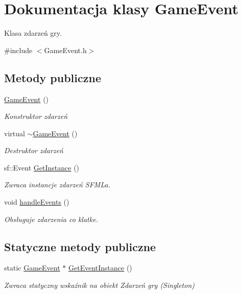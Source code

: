 \hypertarget{class_game_event}{}\section{Dokumentacja klasy Game\+Event}
\label{class_game_event}


Klasa zdarzeń gry.  




{\ttfamily \#include $<$Game\+Event.\+h$>$}

\subsection*{Metody publiczne}
\begin{DoxyCompactItemize}
\item 
\mbox{\hyperlink{class_game_event_a0a8133b65ffc98712879d18186ef3020}{Game\+Event}} ()
\begin{DoxyCompactList}\small\item\em Konstruktor zdarzeń \end{DoxyCompactList}\item 
virtual \mbox{\hyperlink{class_game_event_aaf514ed35c80bbbcc54ce411d9d71eef}{$\sim$\+Game\+Event}} ()
\begin{DoxyCompactList}\small\item\em Destruktor zdarzeń \end{DoxyCompactList}\item 
sf\+::\+Event \mbox{\hyperlink{class_game_event_adbf21138a4eb40624a0f40b2ff75f6db}{Get\+Instance}} ()
\begin{DoxyCompactList}\small\item\em Zwraca instancje zdarzeń S\+F\+ML\textquotesingle{}a. \end{DoxyCompactList}\item 
void \mbox{\hyperlink{class_game_event_a73a56d31069079123f03f20855cb9bf0}{handle\+Events}} ()
\begin{DoxyCompactList}\small\item\em Obsługuje zdarzenia co klatke. \end{DoxyCompactList}\end{DoxyCompactItemize}
\subsection*{Statyczne metody publiczne}
\begin{DoxyCompactItemize}
\item 
static \mbox{\hyperlink{class_game_event}{Game\+Event}} $\ast$ \mbox{\hyperlink{class_game_event_a683bf5025fe1a31263cb96059fc9e5a5}{Get\+Event\+Instance}} ()
\begin{DoxyCompactList}\small\item\em Zwraca statyczny wskaźnik na obiekt Zdarzeń gry (Singleton) \end{DoxyCompactList}\end{DoxyCompactItemize}


